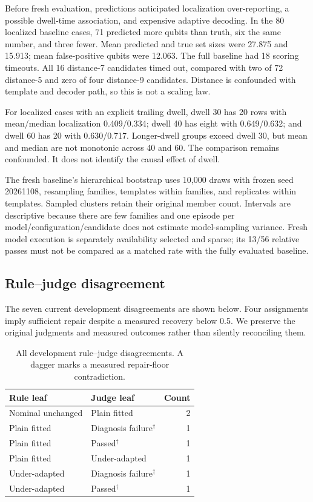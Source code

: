 Before fresh evaluation, predictions anticipated localization over-reporting, a possible dwell-time association, and expensive adaptive decoding. In the 80 localized baseline cases, 71 predicted more qubits than truth, six the same number, and three fewer. Mean predicted and true set sizes were 27.875 and 15.913; mean false-positive qubits were 12.063. The full baseline had 18 scoring timeouts. All 16 distance-7 candidates timed out, compared with two of 72 distance-5 and zero of four distance-9 candidates. Distance is confounded with template and decoder path, so this is not a scaling law.

For localized cases with an explicit trailing dwell, dwell 30 has 20 rows with mean/median localization 0.409/0.334; dwell 40 has eight with 0.649/0.632; and dwell 60 has 20 with 0.630/0.717. Longer-dwell groups exceed dwell 30, but mean and median are not monotonic across 40 and 60. The comparison remains confounded. It does not identify the causal effect of dwell.

The fresh baseline's hierarchical bootstrap uses 10,000 draws with frozen seed 20261108, resampling families, templates within families, and replicates within templates. Sampled clusters retain their original member count. Intervals are descriptive because there are few families and one episode per model/configuration/candidate does not estimate model-sampling variance. Fresh model execution is separately availability selected and sparse; its 13/56 relative passes must not be compared as a matched rate with the fully evaluated baseline.

\subsection{Rule--judge disagreement}
The seven current development disagreements are shown below. Four assignments imply sufficient repair despite a measured recovery below 0.5. We preserve the original judgments and measured outcomes rather than silently reconciling them.

\begin{table}[ht]
\centering\small
\caption{All development rule--judge disagreements. A dagger marks a measured repair-floor contradiction.}
\begin{tabular}{llr}\toprule
Rule leaf & Judge leaf & Count\\\midrule
Nominal unchanged & Plain fitted & 2\\
Plain fitted & Diagnosis failure$^\dagger$ & 1\\
Plain fitted & Passed$^\dagger$ & 1\\
Plain fitted & Under-adapted & 1\\
Under-adapted & Diagnosis failure$^\dagger$ & 1\\
Under-adapted & Passed$^\dagger$ & 1\\\bottomrule
\end{tabular}
\end{table}

